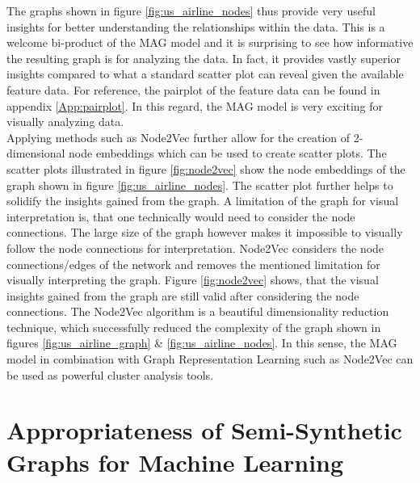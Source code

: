   \noindent The graphs shown in figure \ref{fig:us_airline_nodes} thus provide 
  very useful insights for better understanding the relationships within 
  the data. This is a welcome bi-product of the MAG model and it is surprising 
  to see how informative the resulting graph is for analyzing the data. In fact, 
  it provides vastly superior insights compared to what a standard scatter plot 
  can reveal given the available feature data. For reference, the pairplot of 
  the feature data can be found in appendix \ref{App:pairplot}. In this regard, 
  the MAG model is very exciting for visually analyzing data. \\

  \noindent Applying methods such as Node2Vec further allow for the creation
  of 2-dimensional node embeddings which can be used to create scatter plots. The
  scatter plots illustrated in figure \ref{fig:node2vec} show the node embeddings 
  of the graph shown in figure \ref{fig:us_airline_nodes}. The scatter plot further
  helps to solidify the insights gained from the graph. A limitation of the
  graph for visual interpretation is, that one technically would need to
  consider the node connections. The large size of the graph however makes it
  impossible to visually follow the node connections for interpretation. Node2Vec
  considers the node connections/edges of the network and removes the mentioned
  limitation for visually interpreting the graph. Figure \ref{fig:node2vec}
  shows, that the visual insights gained from the graph are still valid after
  considering the node connections. The Node2Vec algorithm is a beautiful
  dimensionality reduction technique, which successfully reduced the complexity
  of the graph shown in figures \ref{fig:us_airline_graph} \& 
  \ref{fig:us_airline_nodes}. In this sense, the MAG model in combination with
  Graph Representation Learning such as Node2Vec can be used as powerful
  cluster analysis tools.
  
  \section{Appropriateness of Semi-Synthetic Graphs for Machine Learning}
  \label{section:gml_performance}


